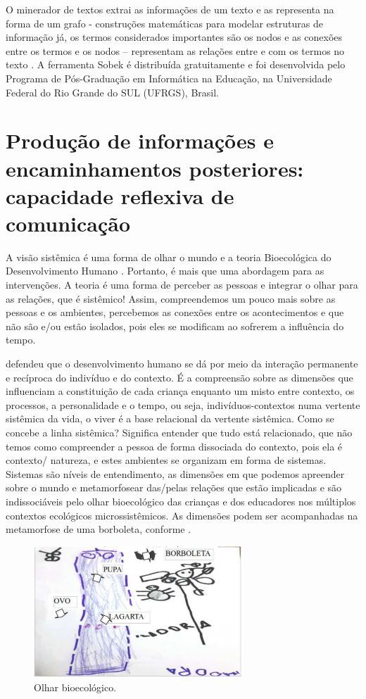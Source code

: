 \documentclass{textolivre}
\begin{document}
O minerador de textos extrai as informações de um texto e as representa na forma de um grafo - construções matemáticas para modelar estruturas de informação já, os termos considerados importantes são os nodos e as conexões entre os termos e os nodos – representam as relações entre e com os termos no texto \cite{epstein2017}. A ferramenta Sobek é distribuída gratuitamente e foi desenvolvida pelo Programa de Pós-Graduação em Informática na Educação, na Universidade Federal do Rio Grande do SUL (UFRGS), Brasil.




\section{Produção de informações e encaminhamentos posteriores: capacidade reflexiva de comunicação}\label{sec-producao}

A visão sistêmica é uma forma de olhar o mundo e a teoria Bioecológica do Desenvolvimento Humano \cite{brofen2011}. Portanto, é mais que uma abordagem para as intervenções. A teoria é uma forma de perceber as pessoas e integrar o olhar para as relações, que é sistêmico! Assim, compreendemos um pouco mais sobre as pessoas e os ambientes, percebemos as conexões entre os acontecimentos e que não são e/ou estão isolados, pois eles se modificam ao sofrerem a influência do tempo. 

\textcite{brofen2011} defendeu que o desenvolvimento humano se dá por meio da interação permanente e recíproca do indivíduo e do contexto. É a compreensão sobre as dimensões que influenciam a constituição de cada criança enquanto um misto entre contexto, os processos, a personalidade e o tempo, ou seja, indivíduos-contextos numa vertente sistêmica da vida, o viver é a base relacional da vertente sistêmica. Como se concebe a linha sistêmica? Significa entender que tudo está relacionado, que não temos como compreender a pessoa de forma dissociada do contexto, pois ela é contexto/ natureza, e estes ambientes se organizam em forma de sistemas. Sistemas são níveis de entendimento, as dimensões em que podemos apreender sobre o mundo e metamorfosear das/pelas relações que estão implicadas e são indissociáveis pelo olhar bioecológico das crianças e dos educadores nos múltiplos contextos ecológicos microssistêmicos. As dimensões podem ser acompanhadas na metamorfose de uma borboleta, conforme . 

\begin{figure}[h!]
 \centering
 \includegraphics[width=0.7\textwidth]{figure03.pdf}
 \caption{Olhar bioecológico.}
 \label{fig-fig03}
\end{figure}
\end{document}
